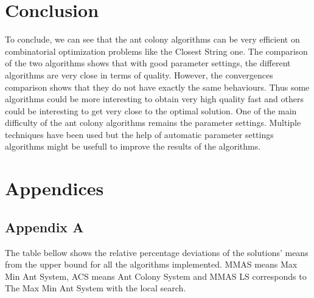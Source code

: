 \documentclass{article}
\begin{document}
\section*{Conclusion}

To conclude, we can see that the ant colony algorithms can be very efficient on combinatorial optimization problems like the Closest String one.
The comparison of the two algorithms shows that with good parameter settings, the different algorithms are very close in terms of quality.
However, the convergences comparison shows that they do not have exactly the same behaviours.
Thus some algorithms could be more interesting to obtain very high quality fast and others could be interesting to get very close to the optimal solution.
One of the main difficulty of the ant colony algorithms remains the parameter settings.
Multiple techniques have been used but the help of automatic parameter settings algorithms might be usefull to improve the results of the algorithms.

\section{Appendices}

\subsection{Appendix A}

The table bellow shows the relative percentage deviations of the solutions' means from the upper bound for all the algorithms implemented.
MMAS means Max Min Ant System, ACS means Ant Colony System and MMAS LS corresponds to The Max Min Ant System with the local search.\\

\label{app:rpd}
\end{document}
